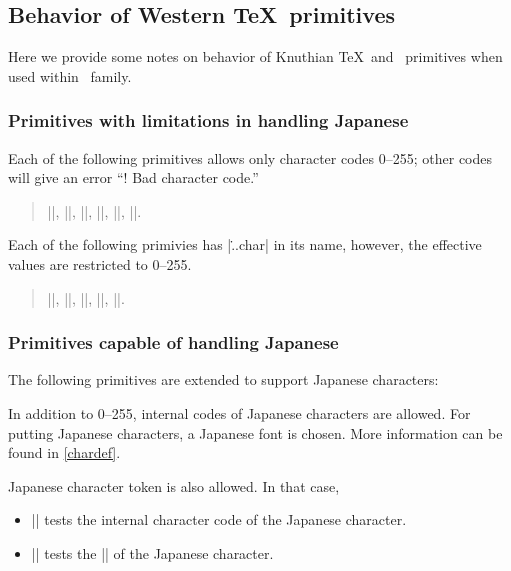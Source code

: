 \documentclass[a4paper,11pt,dvipdfmx]{article}
\begin{document}
\subsection{Behavior of Western \TeX\ primitives}

Here we provide some notes on behavior of Knuthian \TeX\ and \eTeX\ primitives
when used within \pTeX\ family.

\subsubsection{Primitives with limitations in handling Japanese}

Each of the following primitives allows only character codes 0--255;
other codes will give an error ``! Bad character code.''
\begin{quote}
 |\catcode|,
 |\sfcode|,
 |\mathcode|,
 |\delcode|,
 |\lccode|,
 |\uccode|.
\end{quote}

Each of the following primivies has |\...char| in its name,
however, the effective values are restricted to 0--255.
\begin{quote}
 |\endlinechar|,
 |\newlinechar|,
 |\escapechar|,
 ||,
 ||.
\end{quote}

\subsubsection{Primitives capable of handling Japanese}

The following primitives are extended to support Japanese characters:
\begin{cslist}
 \csitem[\.{char} <character code>,
   \.{chardef} <control sequence>=<character code>]
  In addition to 0--255, internal codes of Japanese characters are allowed.
  For putting Japanese characters, a Japanese font is chosen.
  More information can be found in \ref{chardef}.


 \csitem[\.{accent} <character code>=<character>]

  Japanese character token is also allowed.
  In that case,
  \begin{itemize}
    \item |\if| tests the internal character code of the Japanese character.
    \item |\ifcat| tests the |\kcatcode| of the Japanese character.
  \end{itemize}
\end{cslist}
\end{document}
